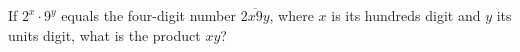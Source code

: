 If $2^x\cdot9^y$ equals the four-digit number $\overline{2x9y}$, where $x$ is its hundreds digit and $y$ its units digit, what is the product $xy$?
